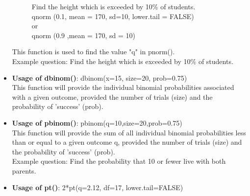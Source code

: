 \documentclass[12pt]{book}
\begin{document}
\begin{itemize}
\begin{figure} [H]
Find the height which is exceeded by 10\% of students.\\
qnorm (0.1, mean = 170, sd=10, lower.tail = FALSE)\\
or\\
qnorm (0.9 ,mean = 170, sd = 10)\\
\end{figure}
This function is used to find the value "q" in pnorm(). \\
Example question: Find the height which is exceeded by 10\% of students.

\item \textbf{Usage of dbinom()}: dbinom(x=15, size=20, prob=0.75) \\
This function will provide the individual binomial probabilities associated with a given outcome, provided the number of trials (size) and the probability of 'success' (prob).

\item \textbf{Usage of pbinom()}: pbinom(q=10,size=20,prob=0.75) \\
This function will provide the sum of all individual binomial probabilities less than or equal to a given outcome q, provided the number of trials (size) and the probability of 'success' (prob). \\
Example question: Find the probability that 10 or fewer live with both parents.

\item \textbf{Usage of pt()}: 2*pt(q=2.12, df=17, lower.tail=FALSE)

\begin{figure} [H]
\centering
{}
\end{figure}


\end{itemize}
\end{document}
